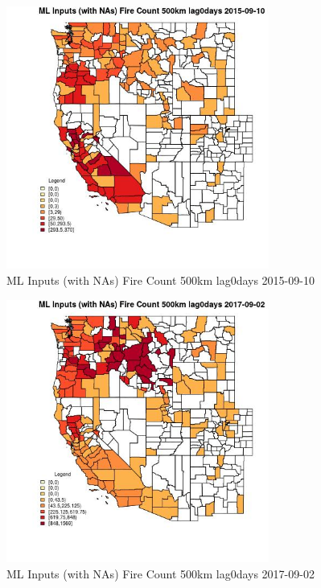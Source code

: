 \begin{figure} 
\centering  
\includegraphics[width=0.77\textwidth]{Code_Outputs/Report_ML_input_PM25_Step4_part_e_de_duplicated_aves_compiled_2019-05-21wNAs_CountyFire_Count_500km_lag0daysMean2015-09-10.jpg} 
\caption{\label{fig:Report_ML_input_PM25_Step4_part_e_de_duplicated_aves_compiled_2019-05-21wNAsCountyFire_Count_500km_lag0daysMean2015-09-10}ML Inputs (with NAs) Fire Count 500km lag0days 2015-09-10} 
\end{figure} 
 

\clearpage 

\begin{figure} 
\centering  
\includegraphics[width=0.77\textwidth]{Code_Outputs/Report_ML_input_PM25_Step4_part_e_de_duplicated_aves_compiled_2019-05-21wNAs_CountyFire_Count_500km_lag0daysMean2017-09-02.jpg} 
\caption{\label{fig:Report_ML_input_PM25_Step4_part_e_de_duplicated_aves_compiled_2019-05-21wNAsCountyFire_Count_500km_lag0daysMean2017-09-02}ML Inputs (with NAs) Fire Count 500km lag0days 2017-09-02} 
\end{figure} 
 

